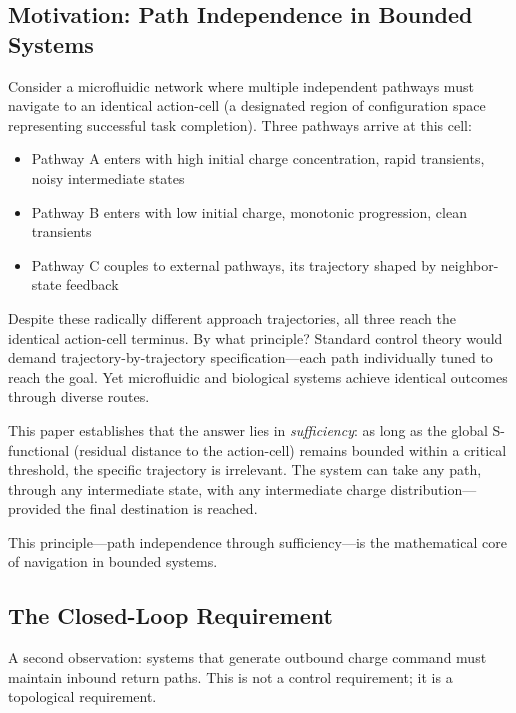 \documentclass[twocolumn,11pt,a4paper]{article}
\begin{document}
\subsection{Motivation: Path Independence in Bounded Systems}

Consider a microfluidic network where multiple independent pathways must navigate to an identical action-cell (a designated region of configuration space representing successful task completion). Three pathways arrive at this cell:

\begin{itemize}[leftmargin=*]
\item Pathway A enters with high initial charge concentration, rapid transients, noisy intermediate states
\item Pathway B enters with low initial charge, monotonic progression, clean transients
\item Pathway C couples to external pathways, its trajectory shaped by neighbor-state feedback
\end{itemize}

Despite these radically different approach trajectories, all three reach the identical action-cell terminus. By what principle? Standard control theory would demand trajectory-by-trajectory specification—each path individually tuned to reach the goal. Yet microfluidic and biological systems achieve identical outcomes through diverse routes.

This paper establishes that the answer lies in \emph{sufficiency}: as long as the global S-functional (residual distance to the action-cell) remains bounded within a critical threshold, the specific trajectory is irrelevant. The system can take any path, through any intermediate state, with any intermediate charge distribution—provided the final destination is reached.

This principle—path independence through sufficiency—is the mathematical core of navigation in bounded systems.

\subsection{The Closed-Loop Requirement}

A second observation: systems that generate outbound charge command must maintain inbound return paths. This is not a control requirement; it is a topological requirement.
\end{document}
